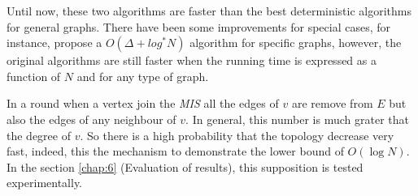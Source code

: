  Until now, these two algorithms are faster than the best deterministic algorithms for general graphs. There have been some improvements for special cases, for instance, \cite{panconesi1996complexity} propose a $O(\Delta + log^* N)$ algorithm for specific graphs, however, the original algorithms are still faster when the running time is expressed as a function of $N$ and for any type of graph.
 
 In a round when a vertex join the \textit{MIS} all the edges of $v$ are remove from $E$ but also the edges of any neighbour of $v$. In general, this number is much grater that the degree of $v$. So there is a high probability that the topology decrease very fast, indeed, this the mechanism to demonstrate the lower bound of $O(\log N)$. In the section \ref{chap:6} (Evaluation of results), this supposition is tested experimentally. 
 



\newpage